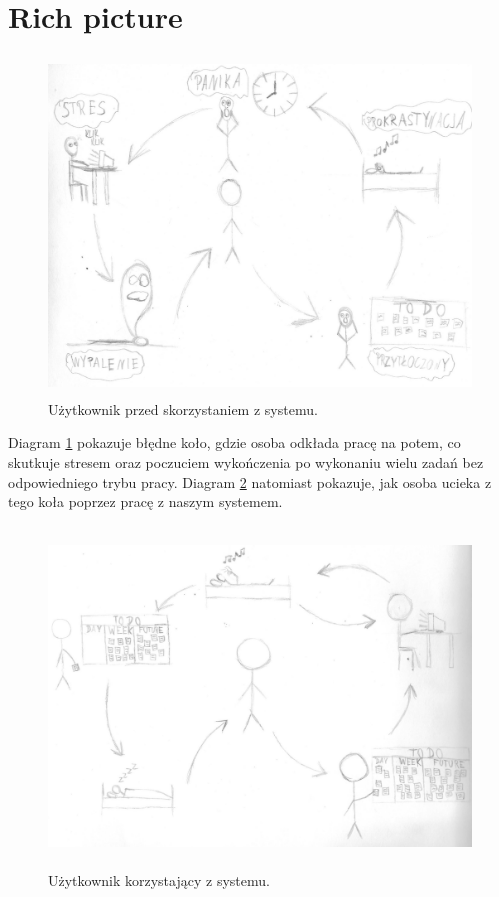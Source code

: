 \documentclass[a4paper,11pt]{report}
\begin{document}
\section {Rich picture}
\begin{figure}[h]
	\centering
	\includegraphics[width=\textwidth, height=9cm]{richpicture1}
	\caption{Użytkownik przed skorzystaniem z systemu.}
	\label{fig:rich1}
\end{figure}
Diagram \ref{fig:rich1} pokazuje błędne koło, gdzie osoba odkłada pracę na potem,
 co skutkuje stresem oraz poczuciem wykończenia po wykonaniu wielu zadań bez odpowiedniego trybu pracy.
Diagram \ref{fig:rich2} natomiast pokazuje, jak osoba ucieka z tego koła poprzez pracę z naszym systemem.
\begin{figure}[h]
	\centering
	\includegraphics[width=\textwidth, height=9cm]{richpicture2}
	\caption{Użytkownik korzystający z systemu.}
	\label{fig:rich2}
\end{figure}
\end{document}
